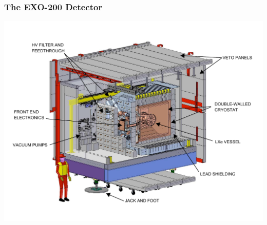 \documentclass{beamer}
\begin{document}
\begin{frame}
\begin{center}
\frametitle{The EXO-200 Detector}
\end{center}
\includegraphics[keepaspectratio=true,width=\textwidth]{cleanroom.pdf}
\end{frame}
\end{document}
